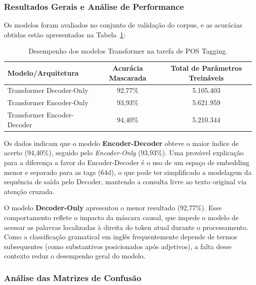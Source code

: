 \documentclass[a4paper,12pt]{article}
\begin{document}
\subsubsection{Resultados Gerais e Análise de Performance}
Os modelos foram avaliados no conjunto de validação do corpus, e as acurácias obtidas estão apresentadas na Tabela~\ref{tab:resultados_transformers}:

\begin{table}[H]
\centering
\begin{tabular}{|l|c|c|}
\hline
\textbf{Modelo/Arquitetura} & \textbf{Acurácia Mascarada} & \textbf{Total de Parâmetros Treináveis} \\ \hline
Transformer Decoder-Only    & 92,77\%                     & 5.105.403                             \\ \hline
Transformer Encoder-Only    & 93,93\%                     & 5.621.959                             \\ \hline
Transformer Encoder-Decoder & 94,40\%                     & 5.210.344                             \\ \hline
\end{tabular}
\caption{Desempenho dos modelos Transformer na tarefa de POS Tagging.}
\label{tab:resultados_transformers}
\end{table}

Os dados indicam que o modelo \textbf{Encoder-Decoder} obteve o maior índice de acerto (94,40\%), seguido pelo \textit{Encoder-Only} (93,93\%). Uma provável explicação para a diferença a favor do Encoder-Decoder é o uso de um espaço de embedding menor e separado para as tags (64d), o que pode ter simplificado a modelagem da sequência de saída pelo Decoder, mantendo a consulta livre ao texto original via atenção cruzada.

O modelo \textbf{Decoder-Only} apresentou o menor resultado (92,77\%). Esse comportamento reflete o impacto da máscara causal, que impede o modelo de acessar as palavras localizadas à direita do token atual durante o processamento. Como a classificação gramatical em inglês frequentemente depende de termos subsequentes (como substantivos posicionados após adjetivos), a falta desse contexto reduz o desempenho geral do modelo.

\subsubsection{Análise das Matrizes de Confusão}
\end{document}
